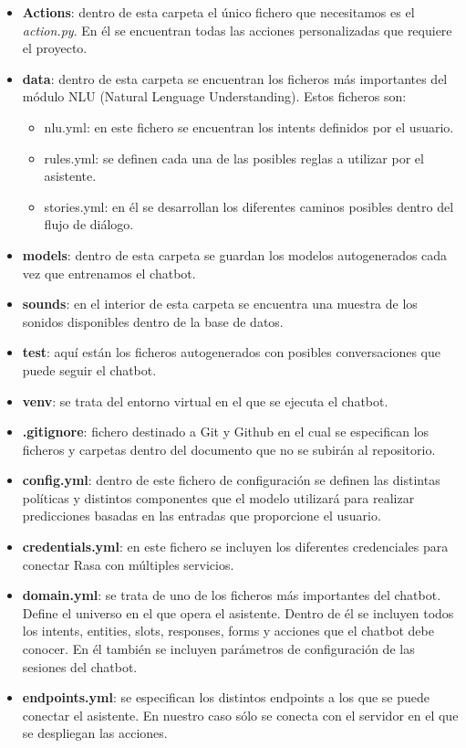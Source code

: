 \begin{itemize}
    \item \textbf{Actions}: dentro de esta carpeta el único fichero que necesitamos es el \textit{action.py}. En él se encuentran todas las acciones personalizadas que requiere el proyecto.
    \item \textbf{data}: dentro de esta carpeta se encuentran los ficheros más importantes del módulo NLU (Natural Lenguage Understanding). Estos ficheros son:
    \begin{itemize}
        \item nlu.yml: en este fichero se encuentran los intents definidos por el usuario.
        \item rules.yml: se definen cada una de las posibles reglas a utilizar por el asistente.
        \item stories.yml: en él se desarrollan los diferentes caminos posibles dentro del flujo de diálogo.
    \end{itemize}
    \item \textbf{models}: dentro de esta carpeta se guardan los modelos autogenerados cada vez que entrenamos el chatbot.
    \item \textbf{sounds}: en el interior de esta carpeta se encuentra una muestra de los sonidos disponibles dentro de la base de datos.
    \item \textbf{test}: aquí están los ficheros autogenerados con posibles conversaciones que puede seguir el chatbot.
    \item \textbf{venv}: se trata del entorno virtual en el que se ejecuta el chatbot.
    \item \textbf{.gitignore}: fichero destinado a Git y Github en el cual se especifican los ficheros y carpetas dentro del documento que no se subirán al repositorio.
    \item \textbf{config.yml}: dentro de este fichero de configuración se definen las distintas políticas y distintos componentes que el modelo utilizará para realizar predicciones basadas en las entradas que proporcione el usuario.
    \item \textbf{credentials.yml}: en este fichero se incluyen los diferentes credenciales para conectar Rasa con múltiples servicios.
    \item \textbf{domain.yml}: se trata de uno de los ficheros más importantes del chatbot. Define el universo en el que opera el asistente. Dentro de él se incluyen todos los intents, entities, slots, responses, forms y acciones que el chatbot debe conocer. En él también se incluyen parámetros de configuración de las sesiones del chatbot.
    \item \textbf{endpoints.yml}: se especifican los distintos endpoints a los que se puede conectar el asistente. En nuestro caso sólo se conecta con el servidor en el que se despliegan las acciones.
\end{itemize}

